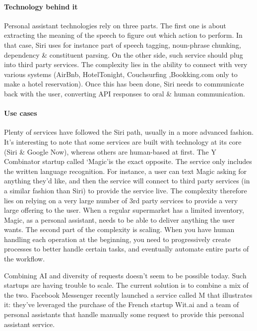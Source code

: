 \documentclass[12pt]{article}
\begin{document}
\paragraph{Technology behind it}
Personal assistant technologies rely on three parts.
The first one is about extracting the meaning of the speech to figure out which
action to perform. In that case, Siri uses for instance part of speech tagging,
noun-phrase chunking, dependency \& constituent parsing. On the other side,
such service should plug into third party services. The complexity lies in the
ability to connect with very various systems (AirBnb, HotelTonight, Couchsurfing
,Bookking.com only to make a hotel reservation). Once this has been done, Siri
needs to communicate back with the user, converting API responses to oral \&
human communication.

\paragraph{Use cases}

Plenty of services have followed the Siri path, usually in a more advanced
fashion. It's interesting to note that some services are built with technology
at its core (Siri \& Google Now), whereas others are human-based at first. The Y
Combinator startup called \lq Magic\rq  is the exact opposite. The service only
includes the written language recognition. For instance, a user can text Magic
asking for anything they'd like, and then the service will connect to third
party services (in a similar fashion than Siri) to provide the service live. The
complexity therefore lies on relying on a very large number of 3rd party
services to provide a very large offering to the user. When a regular supermarket
has a limited inventory, Magic, as a personal assistant, needs to be able to
deliver anything the user wants. The second part of the complexity is scaling.
When you have human handling each operation at the beginning, you need to
progressively create processes to better handle certain tasks, and eventually
automate entire parts of the workflow.

Combining AI and diversity of requests doesn't seem to be possible today. Such
startups are having trouble to scale. The current solution is to combine a mix
of the two. Facebook Messenger recently launched a service called M that
illustrates it: they've leveraged the purchase of the French startup Wit.ai and
a team of personal assistants that handle manually some request to provide this
personal assistant service.
\end{document}
